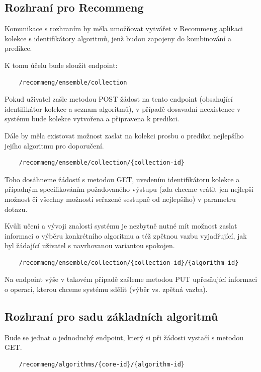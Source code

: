 \documentclass[thesis=M,czech]{FITthesis}[2014/05/07]
\begin{document}
\subsection{Rozhraní pro Recommeng}

Komunikace s rozhraním by měla umožňovat vytvářet v Recommeng aplikaci kolekce s identifikátory algoritmů, jenž budou zapojeny do kombinování a predikce. 

K tomu účelu bude sloužit endpoint:

\begin{verbatim}
	/recommeng/ensemble/collection
\end{verbatim}

Pokud uživatel zašle metodou POST žádost na tento endpoint (obsahující identifikátor kolekce a seznam algoritmů), v případě dosavadní neexistence v systému bude kolekce vytvořena a připravena k predikci. 

Dále by měla existovat možnost zaslat na kolekci prosbu o predikci nejlepšího jejího algoritmu pro doporučení.

\begin{verbatim}
	/recommeng/ensemble/collection/{collection-id}
\end{verbatim}

Toho dosáhneme žádostí s metodou GET, uvedením identifikátoru kolekce a případným specifikováním požadovaného výstupu (zda chceme vrátit jen nejlepší možnost či všechny možnosti seřazené sestupně od nejlepšího) v parametru dotazu.

Kvůli učení a vývoji znalostí systému je nezbytně nutné mít možnost zaslat informaci o výběru konkrétního algoritmu a též zpětnou vazbu vyjadřující, jak byl žádající uživatel s navrhovanou variantou spokojen.

\begin{verbatim}
	/recommeng/ensemble/collection/{collection-id}/{algorithm-id}
\end{verbatim}

Na endpoint výše v takovém případě zašleme metodou PUT upřesňující informaci o operaci, kterou chceme systému sdělit (výběr vs. zpětná vazba).

\subsection{Rozhraní pro sadu základních algoritmů}

Bude se jednat o jednoduchý endpoint, který si při žádosti vystačí s metodou GET.

\begin{verbatim}
	/recommeng/algorithms/{core-id}/{algorithm-id}
\end{verbatim}
\end{document}
